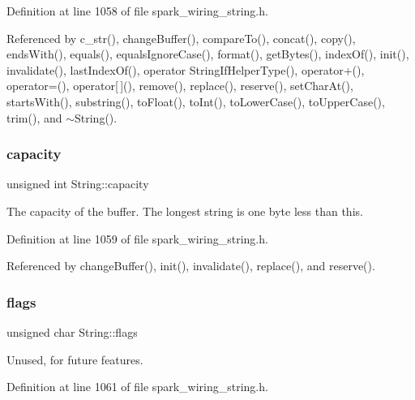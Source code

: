 Definition at line 1058 of file spark\+\_\+wiring\+\_\+string.\+h.



Referenced by c\+\_\+str(), change\+Buffer(), compare\+To(), concat(), copy(), ends\+With(), equals(), equals\+Ignore\+Case(), format(), get\+Bytes(), index\+Of(), init(), invalidate(), last\+Index\+Of(), operator String\+If\+Helper\+Type(), operator+(), operator=(), operator\mbox{[}$\,$\mbox{]}(), remove(), replace(), reserve(), set\+Char\+At(), starts\+With(), substring(), to\+Float(), to\+Int(), to\+Lower\+Case(), to\+Upper\+Case(), trim(), and $\sim$\+String().

\mbox{\label{class_string_af78d6ba64d194d5571319316ee2c41d4}} 
\subsubsection{\texorpdfstring{capacity}{capacity}}
{\footnotesize\ttfamily unsigned int String\+::capacity\hspace{0.3cm}{\ttfamily [protected]}}



The capacity of the buffer. The longest string is one byte less than this. 



Definition at line 1059 of file spark\+\_\+wiring\+\_\+string.\+h.



Referenced by change\+Buffer(), init(), invalidate(), replace(), and reserve().

\mbox{\label{class_string_a46d9dadfcefa61aa12563806c477657b}} 
\subsubsection{\texorpdfstring{flags}{flags}}
{\footnotesize\ttfamily unsigned char String\+::flags\hspace{0.3cm}{\ttfamily [protected]}}



Unused, for future features. 



Definition at line 1061 of file spark\+\_\+wiring\+\_\+string.\+h.



